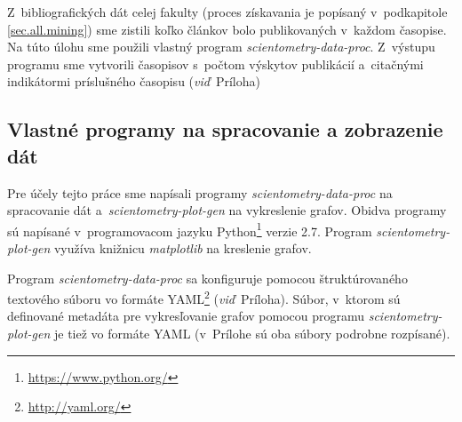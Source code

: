 Z~bibliografických dát celej fakulty (proces získavania je popísaný
v~podkapitole \ref{sec.all.mining}) sme zistili koľko článkov bolo publikovaných
v~každom časopise.  Na túto úlohu sme použili vlastný program
\emph{scientometry-data-proc}.  Z~výstupu programu sme vytvorili časopisov
s~počtom výskytov publikácií a~citačnými indikátormi príslušného časopisu
(\emph{viď}~Príloha)

\subsection{Vlastné programy na spracovanie a zobrazenie dát}
\label{sec:program.my}

Pre účely tejto práce sme napísali programy \emph{scientometry-data-proc} na
spracovanie dát a~\emph{scientometry-plot-gen} na vykreslenie grafov.  Obidva
programy sú napísané v~programovacom jazyku
Python\footnote{\url{https://www.python.org/}} verzie 2.7.  Program
\emph{scientometry-plot-gen} využíva knižnicu \emph{matplotlib} na kreslenie
grafov.

Program \emph{scientometry-data-proc} sa konfiguruje pomocou štruktúrovaného
textového súboru vo formáte YAML\footnote{\url{http://yaml.org/}}
(\emph{viď}~Príloha).  Súbor, v~ktorom sú definované metadáta pre vykresľovanie
grafov pomocou programu \emph{scientometry-plot-gen} je tiež vo formáte YAML
(v~Prílohe sú oba súbory podrobne rozpísané).


